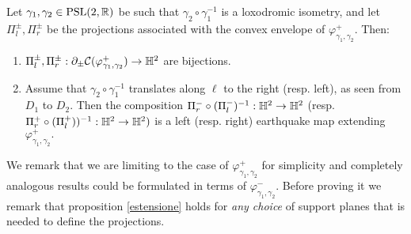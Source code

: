 \begin{proposition}\label{estensione}
    Let $\gamma_1,\gamma_2 \in \text{PSL}(2,\mathbb{R})$ be such that $\gamma_2\circ\gamma_1^{-1}$ is a loxodromic isometry, and let $\Pi_l^\pm, \Pi_r^\pm$ be the projections associated with the convex envelope of $\varphi_{\gamma_1,\gamma_2}^+.$ Then:
    \begin{enumerate}
        \item $\Pi_l^\pm, \Pi_r^\pm:\partial_\pm\mathcal{C}(\varphi_{\gamma_1,\gamma_2}^+)\to\mathbb{H}^2$ are bijections.
        \item Assume that $\gamma_2\circ\gamma_1^{-1}$ translates along $\ell$ to the right (resp. left), as seen from $D_1$ to $D_2.$ Then the composition $\Pi_r^-\circ(\Pi_l^-)^{-1}:\mathbb{H}^2\to\mathbb{H}^2$ (resp. $\Pi_r^+\circ(\Pi_l^+))^{-1}:\mathbb{H}^2\to\mathbb{H}^2)$ is a left (resp. right) earthquake map extending $\varphi_{\gamma_1,\gamma_2}^+.$
    \end{enumerate} 
\end{proposition}

We remark that we are limiting to the case of $\varphi_{\gamma_1,\gamma_2}^+$ for simplicity and completely analogous results could be formulated in terms of $\varphi_{\gamma_1,\gamma_2}^-.$ Before proving it we remark that proposition \ref{estensione} holds for \textit{any choice}  of support planes that is needed to define the projections.

